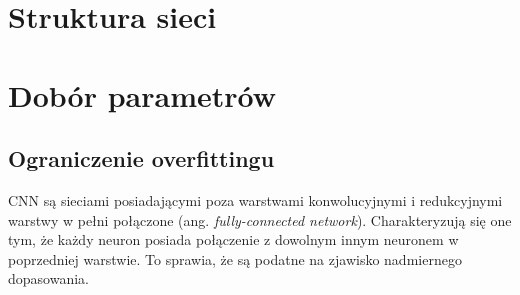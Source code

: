 \section{Struktura sieci}

\section{Dobór parametrów}
\label{dobor_parametrow}

\subsection{Ograniczenie overfittingu}
CNN są sieciami posiadającymi poza warstwami konwolucyjnymi i redukcyjnymi warstwy w pełni połączone (ang. \textit{fully-connected network}). Charakteryzują się one tym, że każdy neuron posiada połączenie z dowolnym innym neuronem w poprzedniej warstwie. To sprawia, że są podatne na zjawisko nadmiernego dopasowania. 
